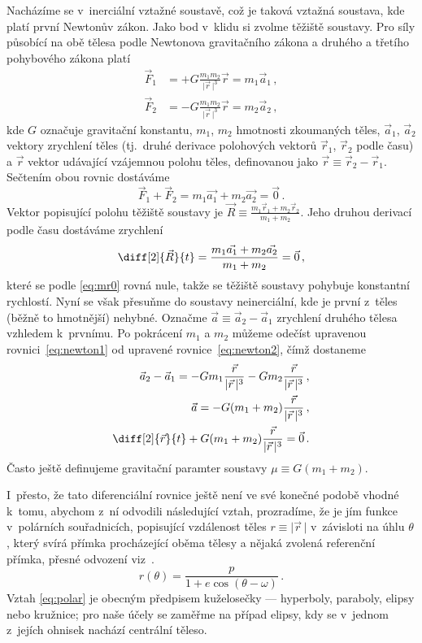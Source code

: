 \documentclass[A4paper, 12pt, oneside]{book}
\newcommand{\abs}[1]{\lvert #1 \,\rvert}
\begin{document}
Nacházíme se v~inerciální vztažné soustavě, což je taková vztažná soustava, kde platí první Newtonův zákon. Jako bod v~klidu si zvolme těžiště soustavy. Pro síly působící na obě tělesa podle Newtonova gravitačního zákona a druhého a třetího pohybového zákona platí
\begin{align} 
	\vec{F}_1 &= +G\frac{m_1m_2}{\abs{\vec{r}}^3}\vec{r} = m_1\vec{a}_1\,, \label{eq:newton1} \\
	\vec{F}_2 &= -G\frac{m_1m_2}{\abs{\vec{r}}^3}\vec{r} = m_2\vec{a}_2\,, \label{eq:newton2}
\end{align}
kde $G$ označuje gravitační konstantu, $m_1$, $m_2$ hmotnosti zkoumaných těles, $\vec{a}_1$, $\vec{a}_2$ vektory zrychlení těles (tj.\ druhé derivace polohových vektorů $\vec{r}_1$, $\vec{r}_2$ podle času) a $\vec{r}$ vektor udávající vzájemnou polohu těles, definovanou jako $\vec{r} \equiv \vec{r}_2 - \vec{r}_1$. Sečtením obou rovnic dostáváme
\begin{equation} \label{eq:mr0}
	\vec{F}_1 + \vec{F}_2 = m_1\vec{a_1} + m_2\vec{a_2} = \vec{0}\,.
\end{equation}
Vektor popisující polohu těžiště soustavy je $\vec{R} \equiv \frac{m_1\vec{r}_1 + m_2\vec{r}_2}{m_1 + m_2}$. Jeho druhou derivací podle času dostáváme zrychlení
\begin{equation*}
	\diff[2]{\vec{R}}{t} = \frac{m_1\vec{a_1} + m_2\vec{a_2}}{m_1+m_2} = \vec{0}\,,
\end{equation*}
které se podle \eqref{eq:mr0} rovná nule, takže se těžiště soustavy pohybuje konstantní rychlostí.
\newpage
Nyní se však přesuňme do soustavy neinerciální, kde je první z~těles (běžně to hmotnější) nehybné. Označme $\vec{a}\equiv\vec{a}_2-\vec{a}_1$ zrychlení druhého tělesa vzhledem k~prvnímu. Po pokrácení $m_1$ a $m_2$ můžeme odečíst upravenou rovnici~\eqref{eq:newton1} od upravené rovnice~\eqref{eq:newton2}, čímž dostaneme
\begin{align}
	\nonumber \vec{a}_2 - \vec{a}_1 = -Gm_1\frac{\vec{r}}{\abs{\vec{r}}^3}-Gm_2\frac{\vec{r}}{\abs{\vec{r}}^3}\,, \\
	\nonumber \vec{a} = -G(m_1+m_2)\frac{\vec{r}}{\abs{\vec{r}}^3}\,, \\
		\diff[2]{\vec{r}}{t} + G(m_1+m_2)\frac{\vec{r}}{\abs{\vec{r}}^3} = \vec{0}\,. \label{eq:eqmotion}
\end{align}
Často ještě definujeme gravitační paramter soustavy $\mu\equiv G(m_1+m_2)$.

I~přesto, že tato diferenciální rovnice ještě není ve své konečné podobě vhodné k~tomu, abychom z~ní odvodili následující vztah, prozradíme, že je jím funkce v~polárních souřadnicích, popisující vzdálenost těles $r\equiv\abs{\vec{r}}$ v~závisloti na úhlu $\theta$, který svírá přímka procházející oběma tělesy a nějaká zvolená referenční přímka, přesné odvození viz~\cite{murray99}.
\begin{equation} \label{eq:polar}
	r(\theta)=\frac{p}{1+e\cos{(\theta-\omega)}}\,.
\end{equation}
Vztah \eqref{eq:polar} je obecným předpisem kuželosečky --- hyperboly, paraboly, elipsy nebo kružnice; pro naše účely se zaměřme na případ elipsy, kdy se v~jednom z~jejích ohnisek nachází centrální těleso.
\end{document}
